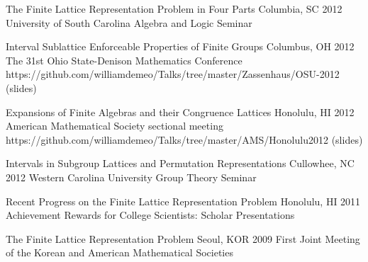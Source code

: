 \talk
    {The Finite Lattice Representation Problem in Four Parts}
    {Columbia, SC 2012}
    {University of South Carolina Algebra and Logic Seminar}  

    \vspace{\vsp}

\talkurl
    {Interval Sublattice Enforceable Properties of Finite Groups} 
    {Columbus, OH 2012}
    {The 31st Ohio State-Denison Mathematics Conference} 
    {https://github.com/williamdemeo/Talks/tree/master/Zassenhaus/OSU-2012}
    {(slides)}

    \vspace{\vsp}

\talkurl
    {Expansions of Finite Algebras and their Congruence Lattices}
    {Honolulu, HI 2012}
    {American Mathematical Society sectional meeting} 
    {https://github.com/williamdemeo/Talks/tree/master/AMS/Honolulu2012}
    {(slides)}
    
    \vspace{\vsp}

\talk
    {Intervals in Subgroup Lattices and Permutation Representations}
    {Cullowhee, NC 2012}
    {Western Carolina University Group Theory Seminar}  

     \vspace{\vsp}

\talk
    {Recent Progress on the Finite Lattice Representation Problem}
    {Honolulu, HI 2011}
    {Achievement Rewards for College Scientists: Scholar Presentations} 

     \vspace{\vsp}

\talk
    {The Finite Lattice Representation Problem}
    {Seoul, KOR 2009}
    {First Joint Meeting of the Korean and American Mathematical Societies} 




